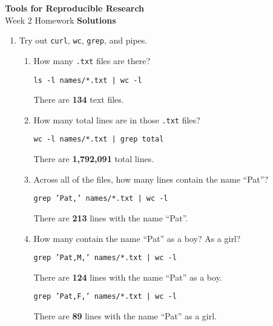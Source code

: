 \documentclass[12pt]{article}
\newcommand{\ttsm}{\tt \small}
\begin{document}
\thispagestyle{empty}

\textbf{Tools for Reproducible Research} \\
Week 2 Homework \textbf{Solutions}

\bigskip

\begin{enumerate}

\addtocounter{enumi}{1}

\item Try out {\ttsm curl}, {\ttsm wc}, {\ttsm grep}, and pipes.

  \begin{enumerate}
    \addtocounter{enumii}{4}

  \item How many {\ttsm .txt} files are there?

    {\tt ls -l names/*.txt | wc -l}

    There are \textbf{134} text files.

  \item How many total lines are in those {\ttsm .txt} files?

    {\tt wc -l names/*.txt | grep total}

    There are \textbf{1,792,091} total lines.

  \item Across all of the files, how many lines contain the name
    ``Pat''?

    {\tt grep 'Pat,' names/*.txt | wc -l}

    There are \textbf{213} lines with the name ``Pat''.

  \item How many contain the name ``Pat'' as a boy? As a girl?

    {\tt grep 'Pat,M,' names/*.txt | wc -l}

    There are \textbf{124} lines with the name ``Pat'' as a boy.

    {\tt grep 'Pat,F,' names/*.txt | wc -l}

    There are \textbf{89} lines with the name ``Pat'' as a girl.

  \end{enumerate}

\end{enumerate}
\end{document}
